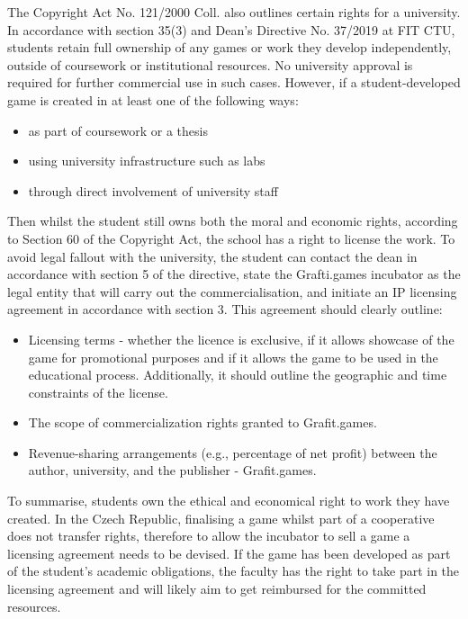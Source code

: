 The Copyright Act No. 121/2000 Coll. also outlines certain rights for a university. In accordance with section 35(3) and Dean’s Directive No. 37/2019 at FIT CTU, students retain full ownership of any games or work they develop independently, outside of coursework or institutional resources. No university approval is required for further commercial use in such cases. However, if a student-developed game is created in at least one of the following ways:
\begin{itemize}
    \item as part of coursework or a thesis
    \item using university infrastructure such as labs
    \item through direct involvement of university staff
\end{itemize}
Then whilst the student still owns both the moral and economic rights, according to Section 60 of the Copyright Act, the school has a right to license the work. To avoid legal fallout with the university, the student can contact the dean in accordance with section 5 of the directive, state the Grafti.games incubator as the legal entity that will carry out the commercialisation, and initiate an IP licensing agreement in accordance with section 3. This agreement should clearly outline:
\begin{itemize}
    \item Licensing terms - whether the licence is exclusive, if it allows showcase of the game for promotional purposes and if it allows the game to be used in the educational process. Additionally, it should outline the geographic and time constraints of the license.
    \item The scope of commercialization rights granted to Grafit.games.
    \item Revenue-sharing arrangements (e.g., percentage of net profit) between the author, university, and the publisher - Grafit.games.
\end{itemize}
To summarise, students own the ethical and economical right to work they have created. In the Czech Republic, finalising a game whilst part of a cooperative does not transfer rights, therefore to allow the incubator to sell a game a licensing agreement needs to be devised. If the game has been developed as part of the student’s academic obligations, the faculty has the right to take part in the licensing agreement and will likely aim to get reimbursed for the committed resources.
